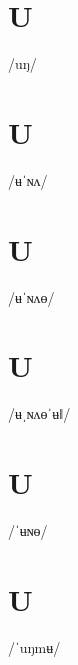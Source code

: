 \documentclass[10pt,a4paper,twoside]{book}
\begin{document}
\section*{U}

\begin{multicols}{3}
 {/uŋ/} {}
\end{multicols}

\section*{U}

\begin{multicols}{3}
 {/ʉˈɴʌ/} {}
\end{multicols}

\section*{U}

\begin{multicols}{3}
 {/ʉˈɴʌɵ/} {}
\end{multicols}

\section*{U}

\begin{multicols}{3}
 {/ʉˌɴʌɵˈʉǁ/} {}
\end{multicols}

\section*{U}

\begin{multicols}{3}
 {/ˈʉɴɵ/} {}
\end{multicols}

\section*{U}

\begin{multicols}{3}
 {/ˈuŋmʉ/} {}
\end{multicols}
\end{document}
